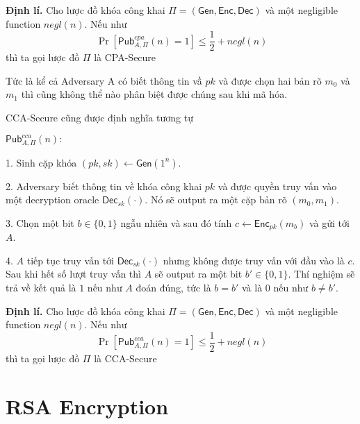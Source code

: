 \documentclass[12pt]{article}
\begin{document}
\textbf{Định lí. }Cho lược đồ khóa công khai $\displaystyle \Pi =(\mathsf{Gen} ,\mathsf{Enc} ,\mathsf{Dec} )$ và một negligible function $\displaystyle negl( n)$. Nếu như
\begin{equation*}
\ \Pr\left[\mathsf{Pub}_{A,\Pi }^{cpa}( n) =1\right] \leqslant \frac{1}{2} +negl( n)
\end{equation*}
thì ta gọi lược đồ $\displaystyle \Pi $ là CPA-Secure

Tức là kể cả Adversary A có biết thông tin vầ $pk$ và được chọn hai bản rõ $m_{0}$ và $m_{1}$ thì cũng không thể nào phân biệt được chúng sau khi mã hóa. 


CCA-Secure cũng được định nghĩa tương tự
\begin{mybox}  
{\begin{exe}
$\displaystyle \mathsf{Pub}_{A,\Pi }^{cca}( n) :$
\end{exe}}
1. Sinh cặp khóa $\displaystyle ( pk,sk)\leftarrow \mathsf{Gen}\left( 1^{n}\right)$.

2. Adversary biết thông tin về khóa công khai $\displaystyle pk$ và được quyền truy vấn vào một decryption oracle $\displaystyle \mathsf{Dec}_{sk}( \cdot )$. Nó sẽ output ra một cặp bản rõ $\displaystyle ( m_{0} ,m_{1})$.

3. Chọn một bit $\displaystyle b\in \{0,1\}$ ngẫu nhiên và sau đó tính $\displaystyle c\leftarrow \mathsf{Enc}_{pk}( m_{b})$	và gửi tới $\displaystyle A$. 

4. $\displaystyle A$ tiếp tục truy vấn tới $\displaystyle \mathsf{Dec}_{sk}( \cdot )$ nhưng không được truy vấn với đầu vào là $\displaystyle c$. Sau khi hết số lượt truy vấn thì $\displaystyle A$ sẽ output ra một bit $\displaystyle b'\in \{0,1\}$. Thí nghiệm sẽ trả về kết quả là $\displaystyle 1$ nếu như $\displaystyle A$ đoán đúng, tức là $\displaystyle b=b'$ và là $\displaystyle 0$ nếu như $\displaystyle b\neq b'$. 

\end{mybox}

\textbf{Định lí. }Cho lược đồ khóa công khai $\displaystyle \Pi =(\mathsf{Gen} ,\mathsf{Enc} ,\mathsf{Dec} )$ và một negligible function $\displaystyle negl( n)$. Nếu như
\begin{equation*}
\ \Pr\left[\mathsf{Pub}_{A,\Pi }^{cca}( n) =1\right] \leqslant \frac{1}{2} +negl( n)
\end{equation*}
thì ta gọi lược đồ $\displaystyle \Pi $ là CCA-Secure



\section{RSA Encryption}
\end{document}
